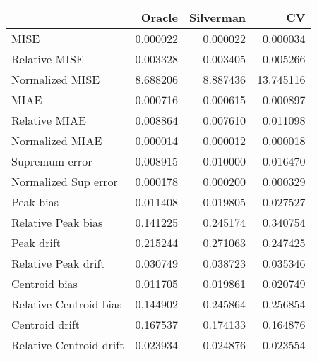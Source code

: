 \begin{tabular}{lrrr}
  \toprule
 & Oracle & Silverman & CV \\ 
  \midrule
MISE & 0.000022 & 0.000022 & 0.000034 \\ 
  Relative MISE & 0.003328 & 0.003405 & 0.005266 \\ 
  Normalized MISE & 8.688206 & 8.887436 & 13.745116 \\ 
  MIAE & 0.000716 & 0.000615 & 0.000897 \\ 
  Relative MIAE & 0.008864 & 0.007610 & 0.011098 \\ 
  Normalized MIAE & 0.000014 & 0.000012 & 0.000018 \\ 
  Supremum error & 0.008915 & 0.010000 & 0.016470 \\ 
  Normalized Sup error & 0.000178 & 0.000200 & 0.000329 \\ 
  Peak bias & 0.011408 & 0.019805 & 0.027527 \\ 
  Relative Peak bias & 0.141225 & 0.245174 & 0.340754 \\ 
  Peak drift & 0.215244 & 0.271063 & 0.247425 \\ 
  Relative Peak drift & 0.030749 & 0.038723 & 0.035346 \\ 
  Centroid bias & 0.011705 & 0.019861 & 0.020749 \\ 
  Relative Centroid bias & 0.144902 & 0.245864 & 0.256854 \\ 
  Centroid drift & 0.167537 & 0.174133 & 0.164876 \\ 
  Relative Centroid drift & 0.023934 & 0.024876 & 0.023554 \\ 
   \bottomrule
\end{tabular}
